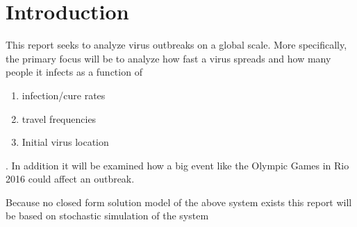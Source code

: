 \section{Introduction}
This report seeks to analyze virus outbreaks on a global scale. More specifically, the primary focus will be to analyze how fast a virus spreads and how many people it infects as a function of 
\begin{enumerate}
	\item infection/cure rates
	\item travel frequencies
	\item Initial virus location
\end{enumerate}
. In addition it will be examined how a big event like the Olympic Games in Rio 2016 could affect an outbreak.

Because no closed form solution model of the above system exists this report will be based on stochastic simulation of the system
